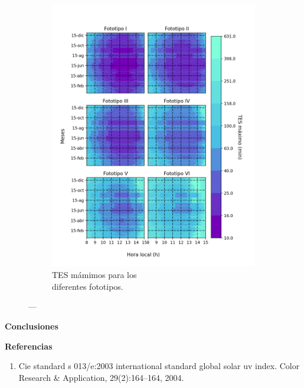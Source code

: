 \documentclass{article}
\begin{document}
\begin{multicols}{2}
\begin{figure}[H]
\begin{subfigure}[H]{0.4\linewidth}
        \includegraphics[scale=0.395]{images/ery.png}
        \changefontsizes{10pt}
        \caption{TES mámimos para los \\diferentes fototipos.}
    \end{subfigure}
    \caption{---}
\end{figure}
\changefontsizes{12pt}
\begin{center}
\begin{shaded}
\changefontsizes{12pt}
\textbf{\textcolor{na}{Conclusiones}}
\end{shaded}
\end{center}
\begin{center}
\begin{shaded}
\textbf{\textcolor{na}{Referencias}}
\end{shaded}
\changefontsizes{7pt}
% 
% 
\begin{enumerate}
\item Cie standard s 013/e:2003 international standard global solar uv index. Color Research \& Application, 29(2):164–164, 2004.

\end{enumerate}
\end{center}
\end{multicols}
\end{document}
